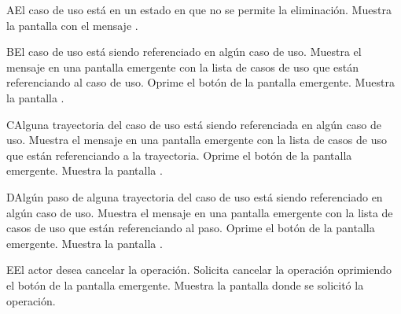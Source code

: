  \begin{UCtrayectoriaA}{A}{El caso de uso está en un estado en que no se permite la eliminación.}
    \UCpaso[\UCsist] Muestra la pantalla  con el mensaje .
 \end{UCtrayectoriaA} 
 \begin{UCtrayectoriaA}{B}{El caso de uso está siendo referenciado en algún caso de uso.}
    \UCpaso[\UCsist] Muestra el mensaje  en una pantalla emergente
    con la lista de casos de uso que están referenciando al caso de uso.
    \UCpaso[\UCactor] Oprime el botón  de la pantalla emergente.
    \UCpaso[\UCsist] Muestra la pantalla .
 \end{UCtrayectoriaA}
 \begin{UCtrayectoriaA}{C}{Alguna trayectoria del caso de uso está siendo referenciada en algún caso de uso.}
    \UCpaso[\UCsist] Muestra el mensaje  en una pantalla emergente
    con la lista de casos de uso que están referenciando a la trayectoria.
    \UCpaso[\UCactor] Oprime el botón  de la pantalla emergente.
    \UCpaso[\UCsist] Muestra la pantalla .
 \end{UCtrayectoriaA}
 \begin{UCtrayectoriaA}{D}{Algún paso de alguna trayectoria del caso de uso está siendo referenciado en algún caso de uso.}
    \UCpaso[\UCsist] Muestra el mensaje  en una pantalla emergente
    con la lista de casos de uso que están referenciando al paso.
    \UCpaso[\UCactor] Oprime el botón  de la pantalla emergente.
    \UCpaso[\UCsist] Muestra la pantalla .
 \end{UCtrayectoriaA}
 \begin{UCtrayectoriaA}{E}{El actor desea cancelar la operación.}
    \UCpaso[\UCactor] Solicita cancelar la operación oprimiendo el botón  de la pantalla emergente.
    \UCpaso[\UCsist] Muestra la pantalla donde se solicitó la operación.
 \end{UCtrayectoriaA} 